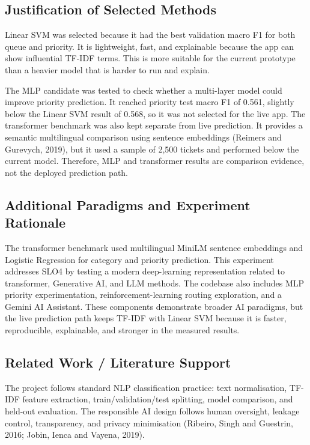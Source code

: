 \documentclass[11pt,a4paper]{article}
\begin{document}
\subsection{Justification of Selected Methods}
Linear SVM was selected because it had the best validation macro F1 for both queue and priority. It is lightweight, fast, and explainable because the app can show influential TF-IDF terms. This is more suitable for the current prototype than a heavier model that is harder to run and explain.

The MLP candidate was tested to check whether a multi-layer model could improve priority prediction. It reached priority test macro F1 of 0.561, slightly below the Linear SVM result of 0.568, so it was not selected for the live app. The transformer benchmark was also kept separate from live prediction. It provides a semantic multilingual comparison using sentence embeddings (Reimers and Gurevych, 2019), but it used a sample of 2,500 tickets and performed below the current model. Therefore, MLP and transformer results are comparison evidence, not the deployed prediction path.

\subsection{Additional Paradigms and Experiment Rationale}
The transformer benchmark used multilingual MiniLM sentence embeddings and Logistic Regression for category and priority prediction. This experiment addresses SLO4 by testing a modern deep-learning representation related to transformer, Generative AI, and LLM methods. The codebase also includes MLP priority experimentation, reinforcement-learning routing exploration, and a Gemini AI Assistant. These components demonstrate broader AI paradigms, but the live prediction path keeps TF-IDF with Linear SVM because it is faster, reproducible, explainable, and stronger in the measured results.

\subsection{Related Work / Literature Support}
The project follows standard NLP classification practice: text normalisation, TF-IDF feature extraction, train/validation/test splitting, model comparison, and held-out evaluation. The responsible AI design follows human oversight, leakage control, transparency, and privacy minimisation (Ribeiro, Singh and Guestrin, 2016; Jobin, Ienca and Vayena, 2019).
\end{document}
